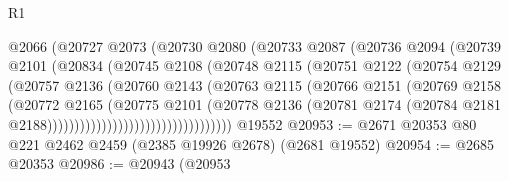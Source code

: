 \begin{lexlean}{R1}
\begin{coremodule}
                                @2066
                                (@20727
                                  @2073
                                  (@20730
                                    @2080
                                    (@20733
                                      @2087
                                      (@20736
                                        @2094
                                        (@20739
                                          @2101
                                          (@20834
                                            (@20745
                                              @2108
                                              (@20748
                                                @2115
                                                (@20751
                                                  @2122
                                                  (@20754
                                                    @2129
                                                    (@20757
                                                      @2136
                                                      (@20760
                                                        @2143
                                                        (@20763
                                                          @2115
                                                          (@20766
                                                            @2151
                                                            (@20769
                                                              @2158
                                                              (@20772
                                                                @2165
                                                                (@20775
                                                                  @2101
                                                                  (@20778
                                                                    @2136
                                                                    (@20781
                                                                      @2174
                                                                      (@20784
                                                                        @2181
                                                                        @2188))))))))))))))))))))))))))))))))))
    @19552
@20953 := @2671 @20353 @80 @221 @2462 @2459 (@2385 @19926 @2678) (@2681 @19552)
@20954 := @2685 @20353
@20986 := @20943
    (@20953

\end{coremodule}
\end{lexlean}
